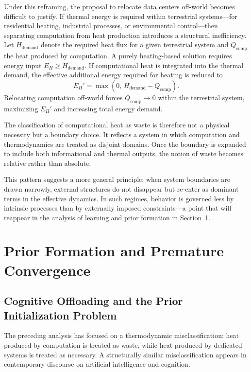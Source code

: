 \documentclass[11pt,a4paper]{article}
\theoremstyle{plain}
\theoremstyle{definition}
\theoremstyle{remark}
\begin{document}
Under this reframing, the proposal to relocate data centers off-world becomes
difficult to justify. If thermal energy is required within terrestrial
systems---for residential heating, industrial processes, or environmental
control---then separating computation from heat production introduces a
structural inefficiency. Let $H_{\mathrm{demand}}$ denote the required heat flux
for a given terrestrial system and $Q_{\mathrm{comp}}$ the heat produced by
computation. A purely heating-based solution requires energy input
$E_H \geq H_{\mathrm{demand}}$. If computational heat is integrated into the
thermal demand, the effective additional energy required for heating is reduced
to
\[
  E_H' = \max(0,\, H_{\mathrm{demand}} - Q_{\mathrm{comp}}).
\]
Relocating computation off-world forces $Q_{\mathrm{comp}} \to 0$ within the
terrestrial system, maximizing $E_H'$ and increasing total energy demand.

The classification of computational heat as waste is therefore not a physical
necessity but a boundary choice. It reflects a system in which computation and
thermodynamics are treated as disjoint domains. Once the boundary is expanded to
include both informational and thermal outputs, the notion of waste becomes
relative rather than absolute.

This pattern suggests a more general principle: when system boundaries are drawn
narrowly, external structures do not disappear but re-enter as dominant terms in
the effective dynamics. In such regimes, behavior is governed less by intrinsic
processes than by externally imposed constraints---a point that will reappear in
the analysis of learning and prior formation in Section~\ref{sec:priors}.

\section{Prior Formation and Premature Convergence}
\label{sec:priors}

\subsection{Cognitive Offloading and the Prior Initialization Problem}

The preceding analysis has focused on a thermodynamic misclassification: heat
produced by computation is treated as waste, while heat produced by dedicated
systems is treated as necessary. A structurally similar misclassification appears
in contemporary discourse on artificial intelligence and cognition.
\end{document}
